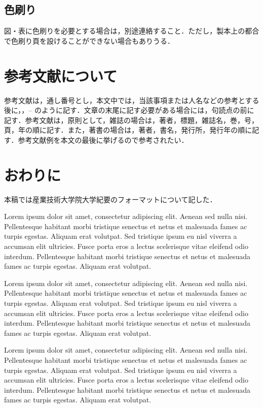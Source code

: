 \begin{multicols}{2}
\subsection{色刷り}
図・表に色刷りを必要とする場合は，別途連絡すること．ただし，製本上の都合で色刷り頁を設けることができない場合もありうる．

\section{参考文献について}
参考文献は，通し番号とし，本文中では，当該事項または人名などの参考とする
後に，\cite{TRA96HuHaCo}，\cite{SICE02Yo}--\cite{Asa02Ar}
のように記す．文章の末尾に記す必要がある場合には，句読点の前に記す．参考文献は，原則として，雑誌の場合は，著者，標題，雑誌名，巻，号，頁，年の順に記す．また，著書の場合は，著者，書名，発行所，発行年の順に記す．参考文献例を本文の最後に挙げるので参考されたい．

\section{おわりに}
本稿では産業技術大学院大学紀要のフォーマットについて記した．

Lorem ipsum dolor sit amet, consectetur adipiscing elit. Aenean sed
nulla nisi. Pellentesque habitant morbi tristique senectus et netus et malesuada
fames ac turpis egestas. Aliquam erat volutpat. Sed tristique ipsum eu nisl
viverra a accumsan elit ultricies. Fusce porta eros a lectus scelerisque vitae
eleifend odio interdum. Pellentesque habitant morbi tristique senectus et netus
et malesuada fames ac turpis egestas. Aliquam erat volutpat.

Lorem ipsum dolor sit amet, consectetur adipiscing elit. Aenean sed
nulla nisi. Pellentesque habitant morbi tristique senectus et netus et malesuada
fames ac turpis egestas. Aliquam erat volutpat. Sed tristique ipsum eu nisl
viverra a accumsan elit ultricies. Fusce porta eros a lectus scelerisque vitae
eleifend odio interdum. Pellentesque habitant morbi tristique senectus et netus
et malesuada fames ac turpis egestas. Aliquam erat volutpat.

Lorem ipsum dolor sit amet, consectetur adipiscing elit. Aenean sed
nulla nisi. Pellentesque habitant morbi tristique senectus et netus et malesuada
fames ac turpis egestas. Aliquam erat volutpat. Sed tristique ipsum eu nisl
viverra a accumsan elit ultricies. Fusce porta eros a lectus scelerisque vitae
eleifend odio interdum. Pellentesque habitant morbi tristique senectus et netus
et malesuada fames ac turpis egestas. Aliquam erat volutpat.


\end{multicols}
